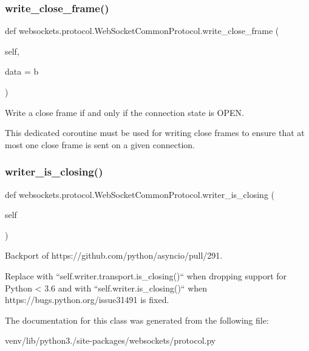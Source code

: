 \subsubsection{\texorpdfstring{write\+\_\+close\+\_\+frame()}{write\_close\_frame()}}
{\footnotesize\ttfamily def websockets.\+protocol.\+Web\+Socket\+Common\+Protocol.\+write\+\_\+close\+\_\+frame (\begin{DoxyParamCaption}\item[{}]{self,  }\item[{}]{data = {\ttfamily b\textquotesingle{}\textquotesingle{}} }\end{DoxyParamCaption})}

\begin{DoxyVerb}Write a close frame if and only if the connection state is OPEN.

This dedicated coroutine must be used for writing close frames to
ensure that at most one close frame is sent on a given connection.\end{DoxyVerb}
 \mbox{\label{classwebsockets_1_1protocol_1_1_web_socket_common_protocol_abc8c8138e1b8a415fdfd3996cb1e7196}} 
\subsubsection{\texorpdfstring{writer\+\_\+is\+\_\+closing()}{writer\_is\_closing()}}
{\footnotesize\ttfamily def websockets.\+protocol.\+Web\+Socket\+Common\+Protocol.\+writer\+\_\+is\+\_\+closing (\begin{DoxyParamCaption}\item[{}]{self }\end{DoxyParamCaption})}

\begin{DoxyVerb}Backport of https://github.com/python/asyncio/pull/291.

Replace with ``self.writer.transport.is_closing()`` when dropping
support for Python < 3.6 and with ``self.writer.is_closing()`` when
https://bugs.python.org/issue31491 is fixed.\end{DoxyVerb}
 

The documentation for this class was generated from the following file\+:\begin{DoxyCompactItemize}
\item 
venv/lib/python3./site-\/packages/websockets/protocol.\+py\end{DoxyCompactItemize}
